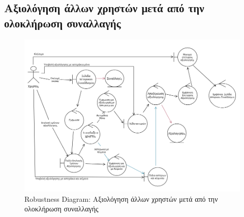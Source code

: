 \documentclass[12pt,a4paper]{article}
\begin{document}
\subsection{Αξιολόγηση άλλων χρηστών μετά από την ολοκλήρωση συναλλαγής}
\begin{figure}[H]
	\includegraphics[width=\textwidth]{Review after Transaction Robustness.png}
	\caption{Robustness Diagram: Αξιολόγηση άλλων χρηστών μετά από την ολοκλήρωση συναλλαγής}
	\label{Robustness Diagram: Αξιολόγηση άλλων χρηστών μετά από την ολοκλήρωση συναλλαγής}
\end{figure}
\end{document}
